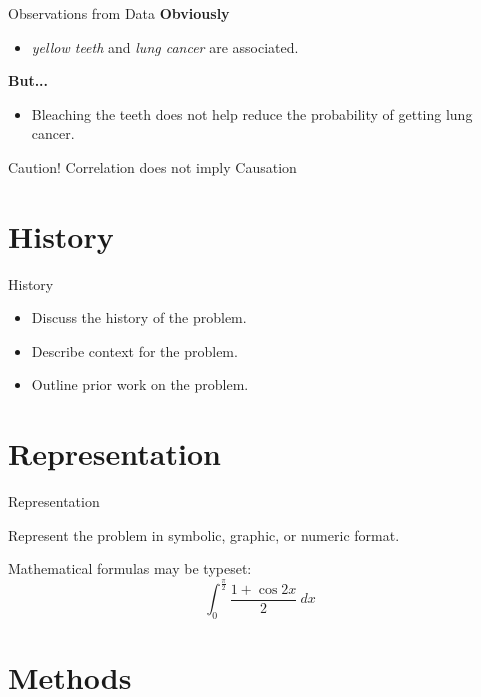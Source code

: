 \documentclass{beamer}
\begin{document}
\begin{frame}{Observations from Data}
\textbf{Obviously}
\begin{itemize}
\item \textit{yellow teeth} and \textit{lung cancer} are associated.
\end{itemize}\pause
\alert{\textbf{But...}}
\begin{itemize}
\item Bleaching the teeth does not help reduce the probability
of getting lung cancer.
\end{itemize}\pause
\begin{alertblock}{Caution!}
Correlation does not imply Causation
\end{alertblock}
\end{frame}
\section{History}

\begin{frame}{History}

\begin{itemize}
\item Discuss the history of the problem.
\item Describe context for the problem.
\item Outline prior work on the problem.
\end{itemize}

\end{frame}



\section{Representation}

\begin{frame}{Representation}

Represent the problem in symbolic, graphic, or numeric format.

\bigskip

Mathematical formulas may be typeset:
\[ \int_0^\frac{\pi}{2}\frac{1+\cos 2x}{2} \: dx \]

\end{frame}



\section{Methods}
\end{document}
